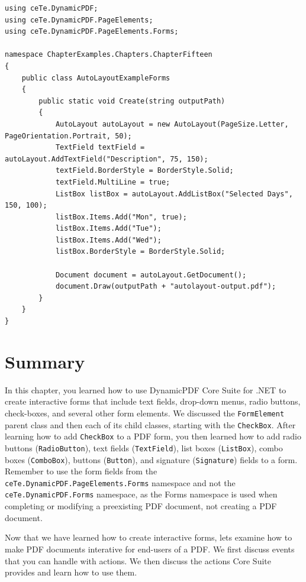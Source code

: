 \documentclass[american]{tufte-book}
\numberwithin{equation}{section}
\numberwithin{figure}{section}
\begin{document}
{\begin{lstlisting}[caption={Using AutoLayout to create a PDF document.},label={lis:autolayout-forms},basicstyle={\footnotesize\ttfamily},breaklines=true]
using ceTe.DynamicPDF;
using ceTe.DynamicPDF.PageElements;
using ceTe.DynamicPDF.PageElements.Forms;

namespace ChapterExamples.Chapters.ChapterFifteen
{
    public class AutoLayoutExampleForms
    {
        public static void Create(string outputPath)
        {
            AutoLayout autoLayout = new AutoLayout(PageSize.Letter, PageOrientation.Portrait, 50);
            TextField textField = autoLayout.AddTextField("Description", 75, 150);
            textField.BorderStyle = BorderStyle.Solid;
            textField.MultiLine = true;
            ListBox listBox = autoLayout.AddListBox("Selected Days", 150, 100);
            listBox.Items.Add("Mon", true);
            listBox.Items.Add("Tue");
            listBox.Items.Add("Wed");
            listBox.BorderStyle = BorderStyle.Solid;

            Document document = autoLayout.GetDocument();
            document.Draw(outputPath + "autolayout-output.pdf");
        }
    }
}

\end{lstlisting}
\leavevmode\egroup

\section{Summary}

In this chapter, you learned how to use DynamicPDF Core Suite
for .NET to create interactive forms that include text fields, drop-down
menus, radio buttons, check-boxes, and several other form elements.
We discussed the \texttt{FormElement} parent class and then each of
its child classes, starting with the \texttt{CheckBox}. After learning
how to add \texttt{CheckBox} to a PDF form, you then learned how to
add radio buttons (\texttt{RadioButton}), text fields (\texttt{TextField}),
list boxes (\texttt{ListBox}), combo boxes (\texttt{ComboBox}), buttons
(\texttt{Button}), and signature (\texttt{Signature}) fields to a
form. Remember to use the form fields from the \texttt{ceTe.DynamicPDF.PageElements.Forms}
namespace and not the \texttt{ceTe.DynamicPDF.Forms} namespace, as
the Forms namespace is used when completing or modifying a preexisting
PDF document, not creating a PDF document.

Now that we have learned how to create interactive forms, lets examine
how to make PDF documents interative for end-users of a PDF. We first
discuss events that you can handle with actions. We then discuss the
actions Core Suite provides and learn how to use them. 

}
\end{document}
